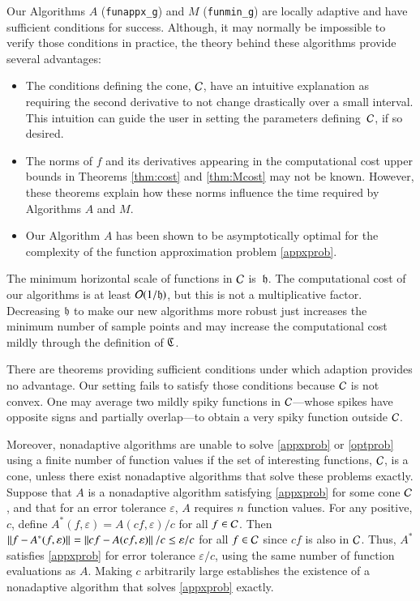 \documentclass[review]{elsarticle}
\newcommand{\abstol}{\varepsilon}
\theoremstyle{definition}
\newcommand{\funappxg}{\texttt{funappx\_g}\xspace}
\newcommand{\funming}{\texttt{funmin\_g}\xspace}
\begin{document}
Our Algorithms $A$ (\funappxg) and $M$ (\funming) are locally adaptive and have
sufficient conditions for success. Although, it may normally be impossible to
verify those conditions in practice, the theory behind these algorithms provide
several advantages: \begin{itemize}
	
\item The conditions defining the cone, $\mathcal{C}$, have an intuitive explanation as
requiring the second derivative to not change drastically over a small interval.
This intuition can guide the user in setting the parameters defining~$\mathcal{C}$, if
so desired.
	
\item The norms of $f$ and its derivatives appearing in the computational cost
upper bounds in Theorems \ref{thm:cost} and \ref{thm:Mcost} may not be known.
However, these theorems explain how these norms influence the time required by
Algorithms $A$ and $M$.
	
\item Our Algorithm $A$ has been shown to be asymptotically optimal for the
complexity of the function approximation problem \eqref{appxprob}.
	
\end{itemize}

The minimum horizontal scale of functions in $\mathcal{C}$ is~$\mathfrak{h}$. The computational
cost of our algorithms is at least $\operatorname{{\mathcal O}}(1/\mathfrak{h})$, but this is not a
multiplicative factor. Decreasing $\mathfrak{h}$ to make our new algorithms more robust
just increases the minimum number of sample points and may increase the
computational cost mildly through the definition of $\mathfrak{C}$.

There are theorems providing sufficient conditions under which adaption provides
no advantage. Our setting fails to satisfy those conditions because $\mathcal{C}$ is not
convex. One may average two mildly spiky functions in $\mathcal{C}$---whose spikes have
opposite signs and partially overlap---to obtain a very spiky function outside
$\mathcal{C}$.

Moreover, nonadaptive algorithms are unable to solve \eqref{appxprob} or
\eqref{optprob} using a finite number of function values if the set of
interesting functions, $\mathcal{C}$, is a cone, unless there exist nonadaptive
algorithms that solve these problems exactly. Suppose that $A$ is a nonadaptive
algorithm satisfying \eqref{appxprob} for some cone $\mathcal{C}$, and that for an error
tolerance $\abstol$, $A$ requires $n$ function values. For any positive, $c$,
define $A^*(f,\abstol) = A(cf,\abstol)/c$ for all $f \in \mathcal{C}$. Then $\norm{f -
A^*(f,\abstol)} = \norm{cf - A(cf,\abstol)}/c\le \abstol/c$ for all $f \in \mathcal{C}$
since $cf$ is also in $\mathcal{C}$. Thus, $A^*$ satisfies \eqref{appxprob} for error
tolerance $\abstol/c$, using the same number of function evaluations as $A$.
Making $c$ arbitrarily large establishes the existence of a nonadaptive
algorithm that solves \eqref{appxprob} exactly.
\end{document}
